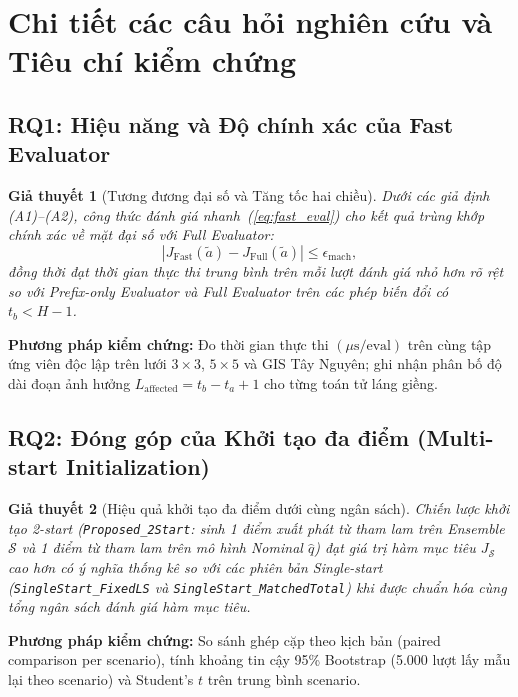 \documentclass[12pt,a4paper]{article}
\newtheorem{hypothesis}{Giả thuyết}
\begin{document}
\section{Chi tiết các câu hỏi nghiên cứu và Tiêu chí kiểm chứng}

\subsection{RQ1: Hiệu năng và Độ chính xác của Fast Evaluator}

\begin{hypothesis}[Tương đương đại số và Tăng tốc hai chiều]
Dưới các giả định (A1)--(A2), công thức đánh giá nhanh~(\ref{eq:fast_eval}) cho kết quả trùng khớp chính xác về mặt đại số với Full Evaluator:
\begin{equation}
|J_{\mathrm{Fast}}(\tilde a) - J_{\mathrm{Full}}(\tilde a)| \le \epsilon_{\mathrm{mach}},
\end{equation}
đồng thời đạt thời gian thực thi trung bình trên mỗi lượt đánh giá nhỏ hơn rõ rệt so với Prefix-only Evaluator và Full Evaluator trên các phép biến đổi có $t_b < H-1$.
\end{hypothesis}

\textbf{Phương pháp kiểm chứng:} Đo thời gian thực thi $(\mu\text{s/eval})$ trên cùng tập ứng viên độc lập trên lưới $3 \times 3$, $5 \times 5$ và GIS Tây Nguyên; ghi nhận phân bố độ dài đoạn ảnh hưởng $L_{\mathrm{affected}} = t_b - t_a + 1$ cho từng toán tử láng giềng.

\subsection{RQ2: Đóng góp của Khởi tạo đa điểm (Multi-start Initialization)}

\begin{hypothesis}[Hiệu quả khởi tạo đa điểm dưới cùng ngân sách]
Chiến lược khởi tạo 2-start (\texttt{Proposed\_2Start}: sinh 1 điểm xuất phát từ tham lam trên Ensemble $\mathcal{S}$ và 1 điểm từ tham lam trên mô hình Nominal $\widehat q$) đạt giá trị hàm mục tiêu $J_{\mathcal{S}}$ cao hơn có ý nghĩa thống kê so với các phiên bản Single-start (\texttt{SingleStart\_FixedLS} và \texttt{SingleStart\_MatchedTotal}) khi được chuẩn hóa cùng tổng ngân sách đánh giá hàm mục tiêu.
\end{hypothesis}

\textbf{Phương pháp kiểm chứng:} So sánh ghép cặp theo kịch bản (paired comparison per scenario), tính khoảng tin cậy 95\% Bootstrap (5.000 lượt lấy mẫu lại theo scenario) và Student's $t$ trên trung bình scenario.
\end{document}
